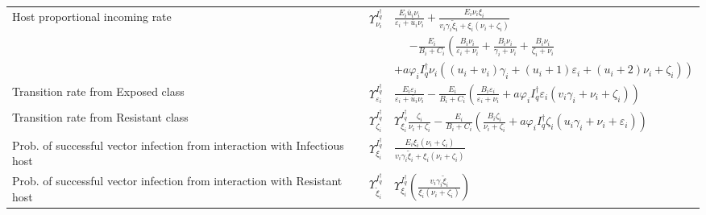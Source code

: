 \documentclass[a4paper]{article}
\newcommand{\starVar}{\dagger}
\begin{document}
\begin{table}[htbp]
\begin{tabular}{p{}p{0.8cm}p{9.5cm}}
Host proportional incoming rate& 
$\varUpsilon_{\nu_i}^{I_q^\starVar}$ & 
$\frac{E_i\bar u_i\nu_i}{\varepsilon_i+\bar u_i\nu_i} 
+ \frac{E_i\nu_i\xi_i}{v_i\gamma_i\widetilde\xi_i+\xi_i(\nu_i+\zeta_i)}$\\ & & ~~ $-\frac{E_i}{B_i+C_i} \left( \frac{B_i \nu_i}{\varepsilon_i+\nu_i} + \frac{B_i \nu_i}{\gamma_i+\nu_i} + \frac{B_i \nu_i}{\zeta_i+\nu_i}\right.$\\
&~&\qquad  
$\left.+ a\varphi_i I^\dagger_q\nu_i\left( (u_i+v_i)\gamma_i + (u_i+1)\varepsilon_i + (u_i+2)\nu_i + \zeta_i \right) \right)$\\

Transition rate from Exposed class&$\varUpsilon_{\varepsilon_i}^{I_q^\starVar}$ &  
$\frac{E_i \varepsilon_i}{\varepsilon_i+\bar u_i\nu_i} - \frac{E_i}{B_i+C_i}\left(\frac{B_i\varepsilon_i}{\varepsilon_i+\nu_i}
+  a\varphi_i I^\dagger_q\varepsilon_i(v_i\gamma_i +\nu_i+ \zeta_i)\right)$\\

Transition rate from Resistant class&
$\varUpsilon_{\zeta_i}^{I_q^\starVar}$ &$\varUpsilon_{\xi_i}^{I_q^\starVar} \frac{\zeta_i}{\nu_i+\zeta_i}
- \frac{ E_i}{B_i+C_i}\left( \frac{B_i  \zeta_i}{\nu_i+\zeta_i} + a \varphi_i    I^\dagger_q \zeta_i
\left( u_i\gamma_i + \nu_i   + \varepsilon_i \right)\right)$\\

Prob. of successful vector infection from interaction with Infectious host & 
$\varUpsilon_{\xi_i}^{I_q^\starVar}$ & 
$\frac{E_i\xi_i(\nu_i+\zeta_i)}{v_i\gamma_i\widetilde\xi_i+\xi_i(\nu_i+\zeta_i)}$\\

Prob. of successful vector infection from interaction with Resistant host & 
$\varUpsilon_{\widetilde\xi_i}^{I_q^\starVar}$ & $\varUpsilon_{\xi_i}^{I_q^\starVar}
\left(\frac{v_i\gamma_i\widetilde\xi_i}{\xi_i(\nu_i+\zeta_i)}\right)$\\

\hline

\end{tabular}
\end{table}
\end{document}
